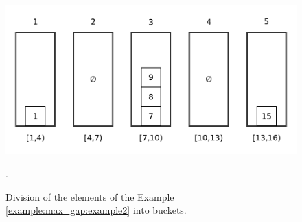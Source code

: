 \begin{figure}
	 \centering
	 \includegraphics[width=\textwidth]{sources/max_gap/images/bucketing_example1}
     \caption{Division of the elements of the Example \ref{example:max_gap:example2} into buckets.}.
	\label{fig:max_gap:bucketing_example2}
\end{figure}

